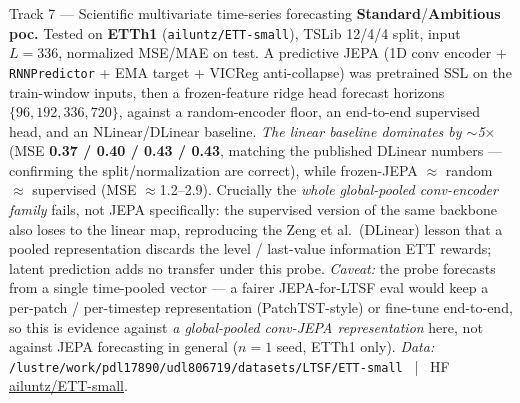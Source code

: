 \documentclass{article}
\newcommand{\code}[1]{\texttt{\small #1}}
\newcommand{\diffmed}{\colorbox{ebamber!18}{\textcolor{ebamber}{\small\bfseries Standard}}}
\newcommand{\diffhard}{\colorbox{ebred!15}{\textcolor{ebred}{\small\bfseries Ambitious}}}
\begin{document}
\begin{trackbox}{Track 7 --- Scientific multivariate time-series forecasting \hfill \diffmed{}/\diffhard{}}
\smallskip
\textbf{poc.} Tested on \textbf{ETTh1} (\code{ailuntz/ETT-small}), TSLib 12/4/4 split,
input $L=336$, normalized MSE/MAE on test. A predictive JEPA (1D conv encoder +
\code{RNNPredictor} + EMA target + VICReg anti-collapse) was pretrained SSL on the
train-window inputs, then a frozen-feature ridge head forecast horizons
$\{96,192,336,720\}$, against a random-encoder floor, an end-to-end supervised head,
and an NLinear/DLinear baseline. \emph{The linear baseline dominates by $\sim$5$\times$}
(MSE \textbf{0.37 / 0.40 / 0.43 / 0.43}, matching the published DLinear numbers ---
confirming the split/normalization are correct), while frozen-JEPA $\approx$ random
$\approx$ supervised (MSE $\approx$1.2--2.9). Crucially the \emph{whole global-pooled
conv-encoder family} fails, not JEPA specifically: the supervised version of the same
backbone also loses to the linear map, reproducing the Zeng et al.\ (DLinear) lesson
that a pooled representation discards the level / last-value information ETT rewards;
latent prediction adds no transfer under this probe. \emph{Caveat:} the probe forecasts
from a single time-pooled vector --- a fairer JEPA-for-LTSF eval would keep a
per-patch / per-timestep representation (PatchTST-style) or fine-tune end-to-end, so this
is evidence against \emph{a global-pooled conv-JEPA representation} here, not against JEPA
forecasting in general ($n{=}1$ seed, ETTh1 only).
\emph{Data:} \code{/lustre/work/pdl17890/udl806719/datasets/LTSF/ETT-small}
~|~ HF \href{https://huggingface.co/datasets/ailuntz/ETT-small}{ailuntz/ETT-small}.
\end{trackbox}
\end{document}
